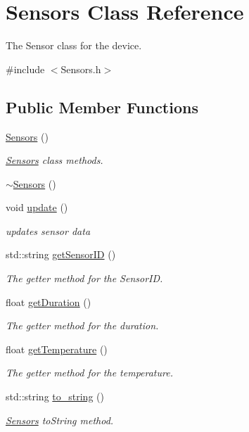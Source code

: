 \hypertarget{classSensors}{}\section{Sensors Class Reference}
\label{classSensors}


The Sensor class for the device.  




{\ttfamily \#include $<$Sensors.\+h$>$}

\subsection*{Public Member Functions}
\begin{DoxyCompactItemize}
\item 
\hyperlink{classSensors_a68ef7a2ec8dd0ffd9b35b70b50c0ab09}{Sensors} ()
\begin{DoxyCompactList}\small\item\em \hyperlink{classSensors}{Sensors} class methods. \end{DoxyCompactList}\item 
\hyperlink{classSensors_ae8757a85e47bb4d61ef3e33cdf3e0d87}{$\sim$\+Sensors} ()
\item 
void \hyperlink{classSensors_af0290d09b1ae4dd7726a2a6613bf354b}{update} ()
\begin{DoxyCompactList}\small\item\em updates sensor data \end{DoxyCompactList}\item 
std\+::string \hyperlink{classSensors_a952bc25379490bd7cb61c670fe2a555a}{get\+Sensor\+ID} ()
\begin{DoxyCompactList}\small\item\em The getter method for the Sensor\+ID. \end{DoxyCompactList}\item 
float \hyperlink{classSensors_a12fb1e3907dfb0b41ac7fd9ed84ceaba}{get\+Duration} ()
\begin{DoxyCompactList}\small\item\em The getter method for the duration. \end{DoxyCompactList}\item 
float \hyperlink{classSensors_ac4c22766994b94a2a28158ed72dc4a0c}{get\+Temperature} ()
\begin{DoxyCompactList}\small\item\em The getter method for the temperature. \end{DoxyCompactList}\item 
std\+::string \hyperlink{classSensors_abc66329aec1385427c139fbb3990a051}{to\+\_\+string} ()
\begin{DoxyCompactList}\small\item\em \hyperlink{classSensors}{Sensors} to\+String method. \end{DoxyCompactList}\end{DoxyCompactItemize}

